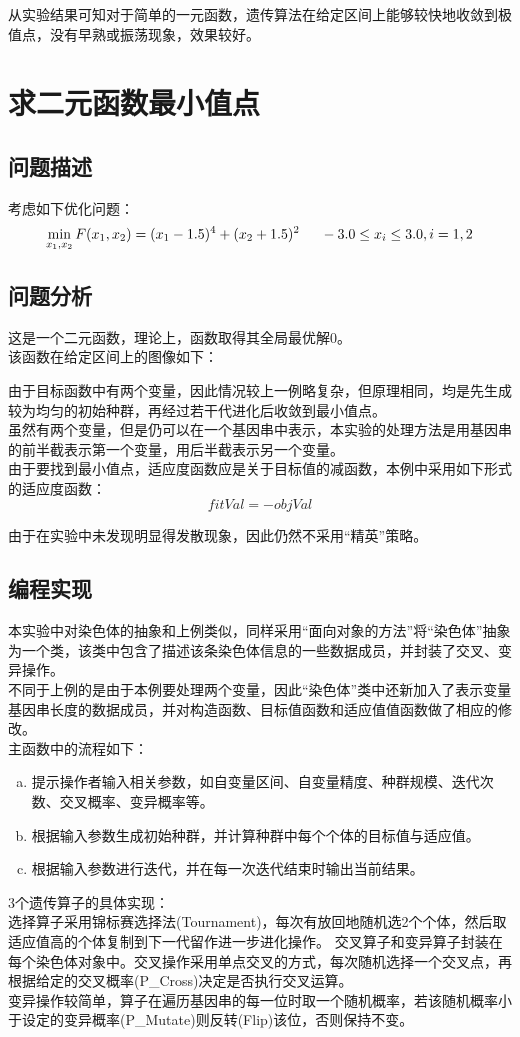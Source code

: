 \documentclass[UTF8]{ctexart}
\begin{document}
\indent 从实验结果可知对于简单的一元函数，遗传算法在给定区间上能够较快地收敛到极值点，没有早熟或振荡现象，效果较好。

\section{求二元函数最小值点}

\subsection{问题描述}
考虑如下优化问题：
\[
	\min_{x_1,x_2} F(x_1,x_2) = (x_1-1.5)^4+(x_2+1.5)^2 \indent -3.0 \leq x_i \leq 3.0,i=1,2 
\]

\subsection{问题分析}
这是一个二元函数，理论上，函数取得其全局最优解0。\\
\indent 该函数在给定区间上的图像如下：

\indent 由于目标函数中有两个变量，因此情况较上一例略复杂，但原理相同，均是先生成较为均匀的初始种群，再经过若干代进化后收敛到最小值点。\\
\indent 虽然有两个变量，但是仍可以在一个基因串中表示，本实验的处理方法是用基因串的前半截表示第一个变量，用后半截表示另一个变量。\\
\indent 由于要找到最小值点，适应度函数应是关于目标值的减函数，本例中采用如下形式的适应度函数：
\[
	fitVal=-objVal
\]

\indent 由于在实验中未发现明显得发散现象，因此仍然不采用“精英”策略。

\subsection{编程实现}

本实验中对染色体的抽象和上例类似，同样采用“面向对象的方法”将“染色体”抽象为一个类，该类中包含了描述该条染色体信息的一些数据成员，并封装了交叉、变异操作。\\
\indent 不同于上例的是由于本例要处理两个变量，因此“染色体”类中还新加入了表示变量基因串长度的数据成员，并对构造函数、目标值函数和适应值值函数做了相应的修改。\\
\indent 主函数中的流程如下：
\begin{enumerate}[(a)]
\item 提示操作者输入相关参数，如自变量区间、自变量精度、种群规模、迭代次数、交叉概率、变异概率等。
\item 根据输入参数生成初始种群，并计算种群中每个个体的目标值与适应值。
\item 根据输入参数进行迭代，并在每一次迭代结束时输出当前结果。
\end{enumerate}
3个遗传算子的具体实现：\\
\indent 选择算子采用锦标赛选择法(Tournament)，每次有放回地随机选2个个体，然后取适应值高的个体复制到下一代留作进一步进化操作。
\indent 交叉算子和变异算子封装在每个染色体对象中。交叉操作采用单点交叉的方式，每次随机选择一个交叉点，再根据给定的交叉概率(P\_Cross)决定是否执行交叉运算。\\
\indent 变异操作较简单，算子在遍历基因串的每一位时取一个随机概率，若该随机概率小于设定的变异概率(P\_Mutate)则反转(Flip)该位，否则保持不变。
\end{document}
